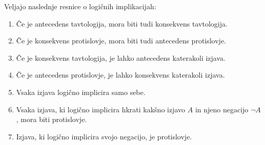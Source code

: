 \documentclass[12pt,a4paper]{article}
\def\inn {{~\wedge~}}
\def\sledi {{~\Rightarrow~}}
\begin{document}
\bigskip
Veljajo naslednje resnice o logičnih implikacijah:
\begin{enumerate}
  \item Če je antecedens tavtologija, mora biti tudi konsekvens tavtologija.
  \item Če je konsekvens protislovje, mora biti tudi antecedens protislovje.
  \item Če je konsekvens tavtologija, je lahko antecedens katerakoli izjava.
  \item Če je antecedens protislovje, je lahko konsekvens katerakoli izjava.
  \item Vsaka izjava logično implicira samo sebe.
  \item Vsaka izjava, ki logično implicira hkrati kakšno izjavo $A$ in njeno negacijo $\neg A$, mora biti protislovje.
  \item Izjava, ki logično implicira svojo negacijo, je protislovje.
\end{enumerate}

\medskip
\iftoggle{long}{
{\color{blue}
Zgled logične implikacije:
$$A \sledi B \sledi (A\inn C \sledi B\inn C)\,.$$
Dokažimo jo. Ta implikacija bi bila nepravilna le pri takem določilu, pri katerem bi bila izjava
$A \sledi B$ pravilna, izjava $A\inn C \sledi B\inn C$ pa nepravilna. To je po definiciji implikacije res samo, če sta izjavi $A\inn C$ pravilni, izjava $B$ pa nepravilna.
V tem primeru pa je implikacija $A \sledi B$ nepravilna, kar je v nasprotju s predpostavko, da je
pravilna. Torej ne obstaja tako določilo, za katero bi bila izjava  $A \sledi B$ pravilna, izjava $A\inn C \sledi B\inn C$ pa nepravilna. Implikacija je res tavtologija.

\medskip
Logične implikacije z majhnim številom osnovnih izjav lahko dokažemo tudi z uporabo pravilnostnih tabel.

\medskip
Na vajah boste spoznali in dokazali številne druge logične implikacije.
}}
{
Zgled logične implikacije:
$$A \sledi B \sledi (A\inn C \sledi B\inn C)\,.$$
Dokažimo jo. Ta implikacija bi bila nepravilna le pri takem določilu, pri katerem bi bila izjava
$A \sledi B$ pravilna, izjava $A\inn C \sledi B\inn C$ pa nepravilna. To je po definiciji implikacije res samo, če sta izjavi $A\inn C$ pravilni, izjava $B$ pa nepravilna.
V tem primeru pa je implikacija $A \sledi B$ nepravilna, kar je v nasprotju s predpostavko, da je
pravilna. Torej ne obstaja tako določilo, za katero bi bila izjava  $A \sledi B$ pravilna, izjava $A\inn C \sledi B\inn C$ pa nepravilna. Implikacija je res tavtologija.

\medskip
Na vajah boste spoznali in dokazali številne druge logične implikacije.
}
\end{document}
